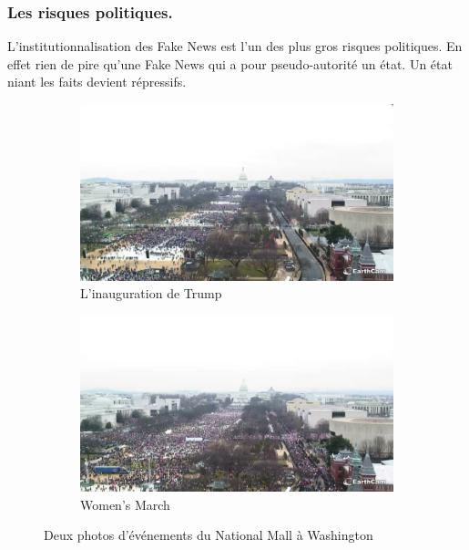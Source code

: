 \subsubsection{Les risques politiques.}
L'institutionnalisation des Fake News est l'un des plus gros risques politiques.
En effet rien de pire qu'une Fake News qui a pour pseudo-autorité un état.
Un état niant les faits devient répressifs.
\begin{center}
 \begin{figure}[h]
  \begin{subfigure}{.5\textwidth}
   \includegraphics[scale=0.240]{../../img/trumpvswomen/trump.png}
   \caption{L'inauguration de Trump}
   \label{fig:sub1}
  \end{subfigure}
  \begin{subfigure}{.5\textwidth}
   \includegraphics[scale=0.240]{../../img/trumpvswomen/women.png}
   \caption{Women’s March}
   \label{fig:sub2}
  \end{subfigure}
  \caption{Deux photos d'événements du National Mall à Washington}
  \label{fig:test}
 \end{figure}
\end{center}

